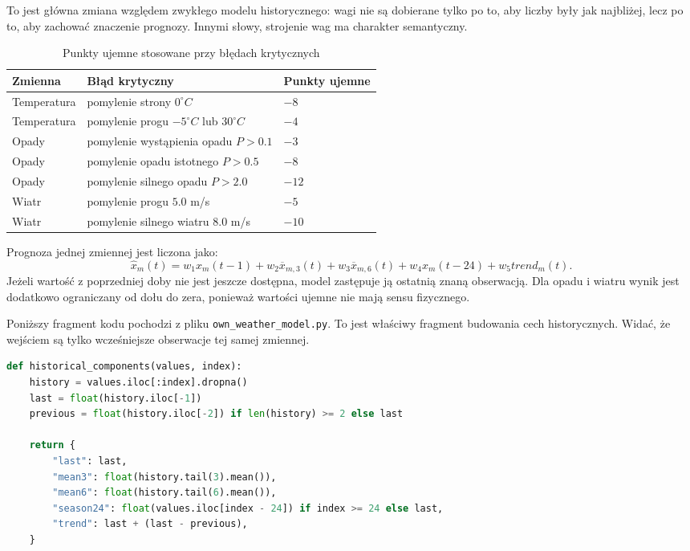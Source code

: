 \documentclass[a4paper,12pt]{article}
\begin{document}
To jest główna zmiana względem zwykłego modelu historycznego: wagi nie są
dobierane tylko po to, aby liczby były jak najbliżej, lecz po to, aby zachować
znaczenie prognozy. Innymi słowy, strojenie wag ma charakter semantyczny.

\begin{table}[h]
\centering
\caption{Punkty ujemne stosowane przy błędach krytycznych}
\small
\begin{tabularx}{\textwidth}{p{3.6cm}p{4.2cm}X}
\toprule
Zmienna & Błąd krytyczny & Punkty ujemne \\
\midrule
Temperatura & pomylenie strony \(0^\circ C\) & \(-8\) \\
Temperatura & pomylenie progu \(-5^\circ C\) lub \(30^\circ C\) & \(-4\) \\
Opady & pomylenie wystąpienia opadu \(P>0.1\) & \(-3\) \\
Opady & pomylenie opadu istotnego \(P>0.5\) & \(-8\) \\
Opady & pomylenie silnego opadu \(P>2.0\) & \(-12\) \\
Wiatr & pomylenie progu \(5.0\) m/s & \(-5\) \\
Wiatr & pomylenie silnego wiatru \(8.0\) m/s & \(-10\) \\
\bottomrule
\end{tabularx}
\normalsize
\end{table}

Prognoza jednej zmiennej jest liczona jako:
\[
\hat{x}_m(t) =
w_1 x_m(t-1) +
w_2 \overline{x}_{m,3}(t) +
w_3 \overline{x}_{m,6}(t) +
w_4 x_m(t-24) +
w_5 trend_m(t).
\]
Jeżeli wartość z poprzedniej doby nie jest jeszcze dostępna, model zastępuje ją
ostatnią znaną obserwacją. Dla opadu i wiatru wynik jest dodatkowo ograniczany
od dołu do zera, ponieważ wartości ujemne nie mają sensu fizycznego.

Poniższy fragment kodu pochodzi z pliku \texttt{own\_weather\_model.py}. To
jest właściwy fragment budowania cech historycznych. Widać, że wejściem są
tylko wcześniejsze obserwacje tej samej zmiennej.

\begin{lstlisting}[language=Python]
def historical_components(values, index):
    history = values.iloc[:index].dropna()
    last = float(history.iloc[-1])
    previous = float(history.iloc[-2]) if len(history) >= 2 else last

    return {
        "last": last,
        "mean3": float(history.tail(3).mean()),
        "mean6": float(history.tail(6).mean()),
        "season24": float(values.iloc[index - 24]) if index >= 24 else last,
        "trend": last + (last - previous),
    }
\end{lstlisting}
\end{document}
